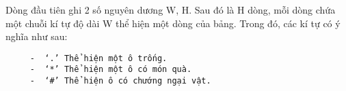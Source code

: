 Dòng đầu tiên ghi 2 số nguyên dương W, H. Sau đó là H dòng, mỗi dòng chứa một chuỗi kí tự độ dài W thể hiện một dòng của bảng. Trong đó, các kí tự có ý nghĩa như sau:  
\begin{verbatim}
     -	‘.’ Thể hiện một ô trống.
     -	‘*’ Thể hiện một ô có món quà.
     -	‘#’ Thể hiện ô có chướng ngại vật.
\end{verbatim}